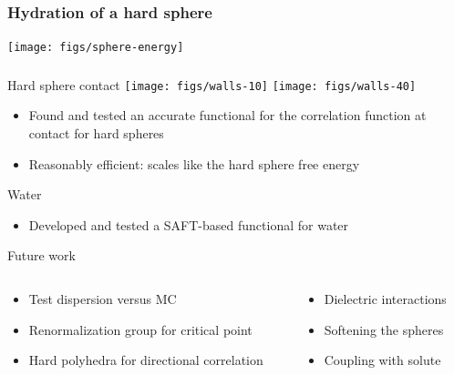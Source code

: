 
\begin{frame}
  \frametitle{Hydration of a hard sphere}
  \begin{center}
    \vspace{-1em}
    \texttt{[image: figs/sphere-energy]}
  \end{center}
  \vspace{-1.5em}
\end{frame}

\begin{frame}
  \frametitle{\conclude}
  \vspace{2em}
  \begin{block}{Hard sphere contact}
    \vspace{-6em}
    \hfill
    \texttt{[image: figs/walls-10]}
    \texttt{[image: figs/walls-40]}
    \begin{itemize}
    \item Found and tested an accurate functional for the correlation
      function at contact for hard spheres
    \item Reasonably efficient: scales like the hard sphere free
      energy
    \end{itemize}
  \end{block}
  \begin{block}{Water}
    \begin{itemize}
    \item Developed and tested a SAFT-based functional for water
    \end{itemize}
  \end{block}
  \begin{block}{Future work}
    \begin{columns}
      \begin{column}{0.7\columnwidth}
        \begin{itemize}
        \item Test dispersion versus MC
        \item Renormalization group for critical point
        \item Hard polyhedra for directional correlation
        \end{itemize}
      \end{column}
      \begin{column}{0.5\columnwidth}
        \begin{itemize}
        \item Dielectric interactions
        \item Softening the spheres
        \item Coupling with solute
        \end{itemize}
      \end{column}
    \end{columns}
  \end{block}
\end{frame}

